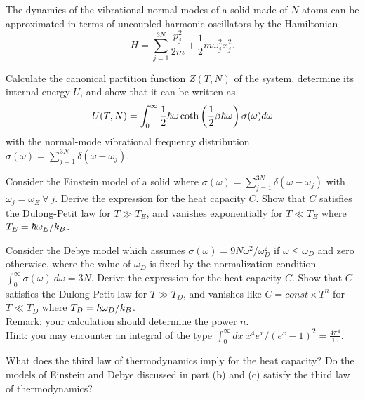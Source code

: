\documentclass[10pt,letterpaper]{article}
\begin{document}
	\item
	The dynamics of the vibrational normal modes of a solid made of $N$ atoms can be approximated in 
	terms of uncoupled harmonic oscillators by the Hamiltonian 
	\[
		H = \sum_{j=1}^{3N} \frac{p_j^2}{2m} +\frac{1}{2}m\omega_j^2x_j^2.
	\]
	\benum
	\item
	Calculate the canonical partition function $Z(T,N)$ of the system, determine its
	internal energy $U$, and show that it can be written as 
	\[
		U(T,N) = \int_0^\infty \frac{1}{2}\hbar\omega \coth\left(\frac{1}{2}\beta\hbar\omega\right)\sigma(\omega)
		d\omega
	\]
	with the normal-mode vibrational frequency distribution $\sigma(\omega) = \sum_{j=1}^{3N}
	\delta(\omega-\omega_j)$.
	\item
	Consider the Einstein model of a solid where $\sigma(\omega) =\sum_{j=1}^{3N}
	\delta(\omega-\omega_j)$ with $\omega_j =\omega_E \ \forall\  j$. Derive the expression for 
	the heat capacity $C$. Show that $C$ satisfies the Dulong-Petit law for $T\gg T_E$, and 
	vanishes exponentially for $T\ll T_E$ where $T_E = \hbar\omega_E/k_B$.
	\item
	Consider the Debye model which assumes $\sigma(\omega) = 9N\omega^2/\omega_D^2$ if
	$\omega \le \omega_D$ and zero otherwise, where the value of $\omega_D$ is fixed
	by the normalization condition $\int_0^\infty \sigma(\omega)\ d\omega = 3N$. Derive the expression
	for the heat capacity $C$. Show that $C$ satisfies the Dulong-Petit law for $T\gg T_D$, and
	vanishes like $C=const\times T^n$ for $T\ll T_D$ where $T_D = \hbar\omega_D/k_B$.
	\\
	Remark: your calculation should determine the power $n$.
	\\
	Hint: you may encounter an integral of the type $\int_0^\infty dx\ x^4 e^x/(e^x-1)^2 = \frac{4\pi^4}{15}$.
	\item
	What does the third law of thermodynamics imply for the heat capacity? Do the models of Einstein and Debye
	discussed in part (b) and (c) satisfy the third law of thermodynamics?
	\\ \\
	\eenum
	\eenum 
\end{document}
